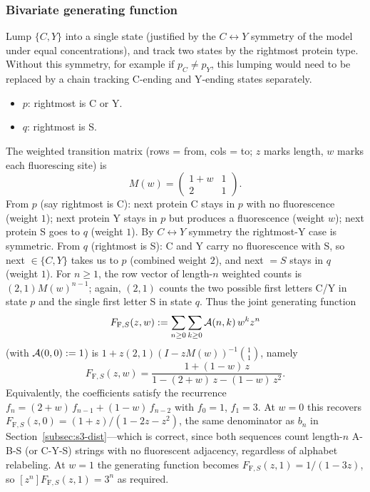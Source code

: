 \documentclass[referee,lineno,pdflatex,sn-mathphys-ay]{sn-jnl}
\newcommand{\cA}{ {\cal A} }
\begin{document}
\subsubsection{Bivariate generating function} Lump $\{C, Y\}$ into a single state (justified by the $C \leftrightarrow Y$ symmetry of the model under equal concentrations), and track two states by the rightmost protein type. Without this symmetry, for example if $p_C \neq p_Y$, this lumping would need to be replaced by a chain tracking C-ending and Y-ending states separately.
\begin{itemize}
\item \textbf{$p$}: rightmost is C or Y.
\item \textbf{$q$}: rightmost is S.
\end{itemize}
The weighted transition matrix (rows = from, cols = to; $z$ marks length, $w$ marks each fluorescing site) is
\[
M(w) = \begin{pmatrix} 1 + w & 1 \\ 2 & 1 \end{pmatrix}.
\]
From $p$ (say rightmost is C): next protein C stays in $p$ with no fluorescence (weight $1$); next protein Y stays in $p$ but produces a fluorescence (weight $w$); next protein S goes to $q$ (weight $1$). By $C \leftrightarrow Y$ symmetry the rightmost-Y case is symmetric. From $q$ (rightmost is S): C and Y carry no fluorescence with S, so next $\in \{C, Y\}$ takes us to $p$ (combined weight $2$), and next $= S$ stays in $q$ (weight $1$). For $n \ge 1$, the row vector of length-$n$ weighted counts is $(2,1)M(w)^{n-1}$; again, $(2,1)$ counts the two possible first letters C/Y in state $p$ and the single first letter S in state $q$. Thus the joint generating function
\[
F_{\text{F},S}(z, w) := \sum_{n \ge 0} \sum_{k \ge 0} \cA(n, k)\, w^k z^n
\]
(with $\cA(0, 0) := 1$) is $1+z(2,1)(I-zM(w))^{-1}\binom{1}{1}$, namely
\begin{equation}\label{eq:s5-bivar-gf}
F_{\text{F},S}(z, w) = \frac{1 + (1 - w)\, z}{1 - (2 + w)\, z - (1 - w)\, z^2}.
\end{equation}
Equivalently, the coefficients satisfy the recurrence $f_n = (2 + w)\, f_{n-1} + (1 - w)\, f_{n-2}$ with $f_0 = 1$, $f_1 = 3$. At $w = 0$ this recovers $F_{\text{F},S}(z, 0) = (1 + z)/(1 - 2z - z^2)$, the same denominator as $b_n$ in Section~\ref{subsec:s3-dist}---which is correct, since both sequences count length-$n$ A-B-S (or C-Y-S) strings with no fluorescent adjacency, regardless of alphabet relabeling. At $w = 1$ the generating function becomes $F_{\text{F},S}(z,1)=1/(1-3z)$, so $[z^n]F_{\text{F},S}(z,1)=3^n$ as required.
\end{document}
